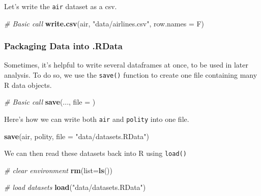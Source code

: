 \documentclass[]{book}
\newenvironment{Shaded}{\begin{snugshade}}{\end{snugshade}}
\newcommand{\CommentTok}[1]{\textcolor[rgb]{0.56,0.35,0.01}{\textit{#1}}}
\newcommand{\DataTypeTok}[1]{\textcolor[rgb]{0.13,0.29,0.53}{#1}}
\newcommand{\KeywordTok}[1]{\textcolor[rgb]{0.13,0.29,0.53}{\textbf{#1}}}
\newcommand{\NormalTok}[1]{#1}
\newcommand{\StringTok}[1]{\textcolor[rgb]{0.31,0.60,0.02}{#1}}
\begin{document}
Let's write the \texttt{air} dataset as a csv.

\begin{Shaded}
\begin{Highlighting}[]
\CommentTok{# Basic call}
\KeywordTok{write.csv}\NormalTok{(air, }\StringTok{"data/airlines.csv"}\NormalTok{, }\DataTypeTok{row.names =}\NormalTok{ F)}
\end{Highlighting}
\end{Shaded}

\hypertarget{packaging-data-into-.rdata}{%
\subsubsection*{Packaging Data into .RData}\label{packaging-data-into-.rdata}}

Sometimes, it's helpful to write several dataframes at once, to be used in later analysis. To do so, we use the \texttt{save()} function to create one file containing many R data objects.

\begin{Shaded}
\begin{Highlighting}[]
\CommentTok{# Basic call}
\KeywordTok{save}\NormalTok{(..., }\DataTypeTok{file =}\NormalTok{ )}
\end{Highlighting}
\end{Shaded}

Here's how we can write both \texttt{air} and \texttt{polity} into one file.

\begin{Shaded}
\begin{Highlighting}[]
\KeywordTok{save}\NormalTok{(air, polity, }\DataTypeTok{file =} \StringTok{"data/datasets.RData"}\NormalTok{)}
\end{Highlighting}
\end{Shaded}

We can then read these datasets back into R using \texttt{load()}

\begin{Shaded}
\begin{Highlighting}[]
\CommentTok{# clear environment}
\KeywordTok{rm}\NormalTok{(}\DataTypeTok{list=}\KeywordTok{ls}\NormalTok{())}

\CommentTok{# load datasets}
\KeywordTok{load}\NormalTok{(}\StringTok{"data/datasets.RData"}\NormalTok{)}
\end{Highlighting}
\end{Shaded}
\end{document}
